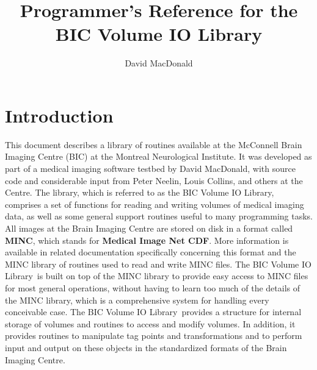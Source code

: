 
\title{Programmer's Reference for the \\
BIC Volume IO Library}

\author{David MacDonald}

\newcommand{\name}[1]{{\bf\tt #1}}

\newcommand{\desc}[1]{\begin{itemize}
\item[] #1
\end{itemize}}

\newcommand{\vol}{BIC Volume IO Library}



\maketitle

\newpage

\tableofcontents

\newpage

\chapter{Introduction}

This document describes a library of routines available at the
McConnell Brain Imaging Centre (BIC) at the Montreal Neurological Institute.
It was developed as part of a medical imaging software testbed by
David MacDonald, with source code and considerable input from Peter
Neelin, Louis Collins, and others at the Centre.
The library, which is referred to as the \vol, comprises a set of functions
for reading and writing
volumes of medical imaging data, as well as some general support
routines useful to many programming tasks.  All images at the Brain
Imaging Centre are stored on disk in a format called {\bf MINC}, which
stands for {\bf Medical Image Net CDF}.  More information 
is available in related documentation specifically concerning this
format and
the MINC library of routines used to read and write MINC files.  The
\vol\  is built on top of the MINC library to
provide easy access to MINC files for most general operations, without
having to learn too much of
the details of the MINC library, which is a comprehensive system for handling
every conceivable case.  The \vol\  provides a structure for internal
storage of volumes and routines to access and modify volumes.  In
addition, it provides routines to manipulate tag points and
transformations and to perform input and output on these objects in
the standardized formats of the Brain Imaging Centre.

